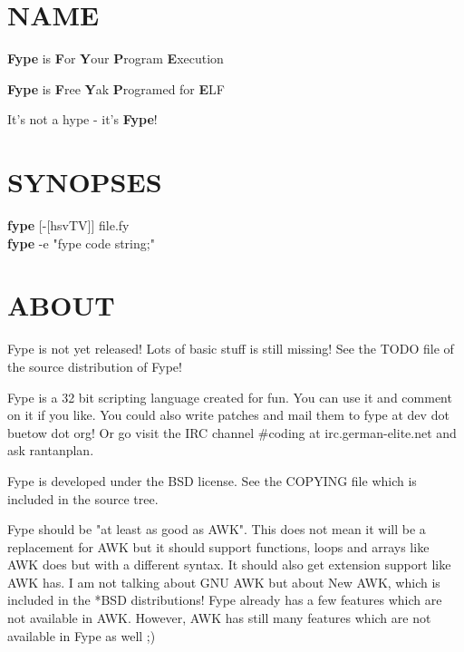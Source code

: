 \section{NAME\label{NAME}}


\textbf{Fype} is \textbf{F}or \textbf{Y}our \textbf{P}rogram \textbf{E}xecution



\textbf{Fype} is \textbf{F}ree \textbf{Y}ak \textbf{P}rogramed for \textbf{E}LF



It's not a hype - it's \textbf{Fype}!

\section{SYNOPSES\label{SYNOPSES}}
\begin{description}

\item[{\textbf{fype} [-[hsvTV]] file.fy}] \mbox{}
\item[{\textbf{fype} -e "fype code string;"}] \mbox{}\end{description}
\section{ABOUT\label{ABOUT}}


Fype is not yet released! Lots of basic stuff is still missing! See the
TODO file of the source distribution of Fype!



Fype is a 32 bit scripting language created for fun. You can use it and comment on it if you like. You could also write patches and mail them to fype at dev dot buetow dot org! Or go visit the IRC channel \#coding at irc.german-elite.net and ask rantanplan.



Fype is developed under the BSD license. See the COPYING file which is included in the source tree.



Fype should be "at least as good as AWK". This does not mean it will be a replacement for AWK but it should support functions, loops and arrays like AWK does but with a different syntax. It should also get extension support like AWK has. I am not talking about GNU AWK but about New AWK, which is included in the *BSD distributions! Fype already has a few features which are not available in AWK. However, AWK has still many features which are not available in Fype as well ;)



